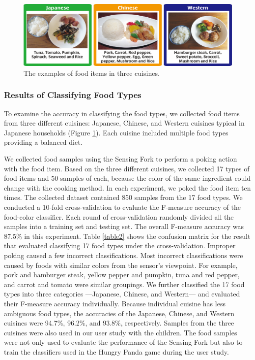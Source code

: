 \begin{figure}[t]
\begin{center}
\includegraphics[width=14cm]{image/recipe01-01.png}
\caption{The examples of food items in three cuisines.}
\label{recipe}
\end{center}
\end{figure}

\subsubsection{Results of Classifying Food Types}
To examine the accuracy in classifying the food types, 
we collected food items from three different cuisines: 
Japanese, Chinese, and Western cuisines typical in Japanese households (Figure \ref{recipe}). 
Each cuisine included multiple food types providing a balanced diet.

We collected food samples using the Sensing Fork to perform a poking action with the food item. 
Based on the three different cuisines, 
we collected 17 types of food items and 50 samples of each, 
because the color of the same ingredient could change with the cooking method. 
In each experiment, we poked the food item ten times. 
The collected dataset contained 850 samples from the 17 food types. 
We conducted a 10-fold cross-validation to evaluate the F-measure accuracy of the food-color classifier. 
Each round of cross-validation randomly divided all the samples into a training set and testing set. 
The overall F-measure accuracy was 87.5\% in this experiment. 
Table \ref{table2} shows the confusion matrix for the result 
that evaluated classifying 17 food types under the cross-validation. 
Improper poking caused a few incorrect classifications. 
Most incorrect classifications were caused by foods with similar colors from the sensor's viewpoint. 
For example, pork and hamburger steak, yellow pepper and pumpkin, tuna and red pepper, 
and carrot and tomato were similar groupings. 
We further classified the 17 food types into three categories 
---Japanese, Chinese, and Western--- 
and evaluated their F-measure accuracy individually. 
Because individual cuisine has less ambiguous food types, 
the accuracies of the Japanese, Chinese, 
and Western cuisines were 94.7\%, 96.2\%, and 93.8\%, respectively. 
Samples from the three cuisines were also used in our user study with the children. 
The food samples were not only used to evaluate the performance of the Sensing Fork 
but also to train the classifiers used in the Hungry Panda game during the user study. 

